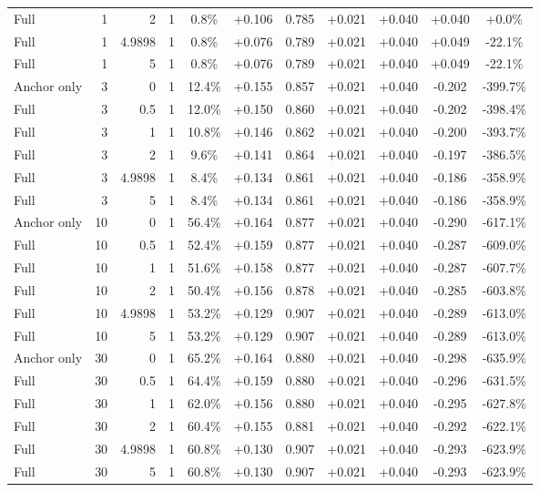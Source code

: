 \begin{table}[htbp]
\begin{tabular}{lrrrccccccc}
Full & 1 & 2 & 1 & 0.8\% & +0.106 & 0.785 & +0.021 & +0.040 & +0.040 & +0.0\% \\
Full & 1 & 4.9898 & 1 & 0.8\% & +0.076 & 0.789 & +0.021 & +0.040 & +0.049 & -22.1\% \\
Full & 1 & 5 & 1 & 0.8\% & +0.076 & 0.789 & +0.021 & +0.040 & +0.049 & -22.1\% \\
Anchor only & 3 & 0 & 1 & 12.4\% & +0.155 & 0.857 & +0.021 & +0.040 & -0.202 & -399.7\% \\
Full & 3 & 0.5 & 1 & 12.0\% & +0.150 & 0.860 & +0.021 & +0.040 & -0.202 & -398.4\% \\
Full & 3 & 1 & 1 & 10.8\% & +0.146 & 0.862 & +0.021 & +0.040 & -0.200 & -393.7\% \\
Full & 3 & 2 & 1 & 9.6\% & +0.141 & 0.864 & +0.021 & +0.040 & -0.197 & -386.5\% \\
Full & 3 & 4.9898 & 1 & 8.4\% & +0.134 & 0.861 & +0.021 & +0.040 & -0.186 & -358.9\% \\
Full & 3 & 5 & 1 & 8.4\% & +0.134 & 0.861 & +0.021 & +0.040 & -0.186 & -358.9\% \\
Anchor only & 10 & 0 & 1 & 56.4\% & +0.164 & 0.877 & +0.021 & +0.040 & -0.290 & -617.1\% \\
Full & 10 & 0.5 & 1 & 52.4\% & +0.159 & 0.877 & +0.021 & +0.040 & -0.287 & -609.0\% \\
Full & 10 & 1 & 1 & 51.6\% & +0.158 & 0.877 & +0.021 & +0.040 & -0.287 & -607.7\% \\
Full & 10 & 2 & 1 & 50.4\% & +0.156 & 0.878 & +0.021 & +0.040 & -0.285 & -603.8\% \\
Full & 10 & 4.9898 & 1 & 53.2\% & +0.129 & 0.907 & +0.021 & +0.040 & -0.289 & -613.0\% \\
Full & 10 & 5 & 1 & 53.2\% & +0.129 & 0.907 & +0.021 & +0.040 & -0.289 & -613.0\% \\
Anchor only & 30 & 0 & 1 & 65.2\% & +0.164 & 0.880 & +0.021 & +0.040 & -0.298 & -635.9\% \\
Full & 30 & 0.5 & 1 & 64.4\% & +0.159 & 0.880 & +0.021 & +0.040 & -0.296 & -631.5\% \\
Full & 30 & 1 & 1 & 62.0\% & +0.156 & 0.880 & +0.021 & +0.040 & -0.295 & -627.8\% \\
Full & 30 & 2 & 1 & 60.4\% & +0.155 & 0.881 & +0.021 & +0.040 & -0.292 & -622.1\% \\
Full & 30 & 4.9898 & 1 & 60.8\% & +0.130 & 0.907 & +0.021 & +0.040 & -0.293 & -623.9\% \\
Full & 30 & 5 & 1 & 60.8\% & +0.130 & 0.907 & +0.021 & +0.040 & -0.293 & -623.9\% \\

\end{tabular}
\end{table}

